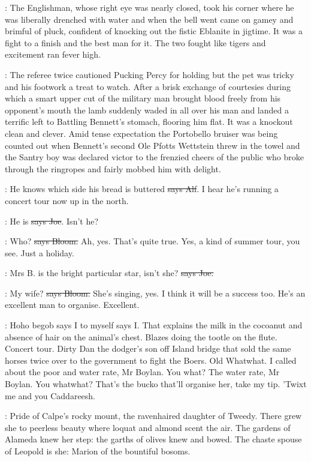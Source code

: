 :
The Englishman, whose right eye was nearly closed, took
his corner where he was liberally drenched with water and when the bell
went came on gamey and brimful of pluck, confident of knocking out the
fistic Eblanite in jigtime. It was a fight to a finish and the best man
for it. The two fought like tigers and excitement ran fever high.

:
The referee twice cautioned Pucking Percy for holding but the pet was tricky
and his footwork a treat to watch. After a brisk exchange of courtesies
during which a smart upper cut of the military man
brought blood freely
from his opponent's mouth the lamb suddenly waded in all over his man and
landed a terrific left to Battling Bennett's stomach, flooring him flat.
It was a knockout clean and clever. Amid tense expectation the Portobello
bruiser was being counted out when Bennett's second Ole Pfotts Wettstein
threw in the towel and the Santry boy was declared victor to the frenzied
cheers of the public who broke through the ringropes and fairly mobbed him
with delight.

\bergan:
He knows which side his bread is buttered \sout{says Alf}.
I hear he's running
a concert tour now up in the north.

\joe:
He is \sout{says Joe}.
Isn't he?

\Bloom:
Who? \sout{says Bloom.}
Ah, yes. That's quite true. Yes, a kind of summer tour,
you see. Just a holiday.

\joe:
Mrs B. is the bright particular star,
isn't she? \sout{says Joe.}

\Bloom:
My wife? \sout{says Bloom.} She's singing, yes.
I think it will be a success too.
He's an excellent man to organise. Excellent.

\Nq:
Hoho begob says I to myself says I. That explains the milk in the cocoanut
and absence of hair on the animal's chest. Blazes doing the tootle on the
flute. Concert tour. Dirty Dan the dodger's son off Island bridge that
sold the same horses twice over to the government to fight the Boers. Old
Whatwhat.
I called about the poor and water rate, Mr Boylan. You what?
The water rate, Mr Boylan. You whatwhat? That's the bucko that'll
organise her, take my tip. 'Twixt me and you Caddareesh.

:
Pride of Calpe's rocky mount, the ravenhaired daughter of Tweedy.
There grew she to peerless beauty where loquat and almond scent the air.
The gardens of Alameda knew her step: the garths of olives knew and
bowed. The chaste spouse of Leopold is she: Marion of the bountiful
bosoms.

